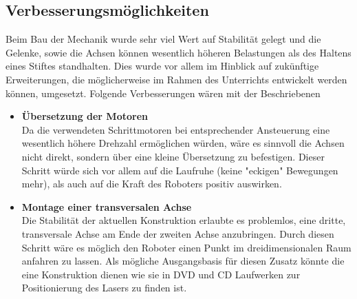 \subsection{Verbesserungsmöglichkeiten}
Beim Bau der Mechanik wurde sehr viel Wert auf Stabilität gelegt und die Gelenke, sowie die Achsen können wesentlich höheren Belastungen als des Haltens eines Stiftes standhalten. 
Dies wurde vor allem im Hinblick auf zukünftige Erweiterungen, die möglicherweise im Rahmen des Unterrichts entwickelt werden können, umgesetzt. Folgende Verbesserungen wären mit der Beschriebenen 

\begin{itemize}
\item \textbf{Übersetzung der Motoren}\\
Da die verwendeten Schrittmotoren bei entsprechender Ansteuerung eine wesentlich höhere Drehzahl ermöglichen würden, wäre es sinnvoll die Achsen nicht direkt, sondern über eine kleine Übersetzung zu befestigen. Dieser Schritt würde sich vor allem auf die Laufruhe (keine "eckigen" Bewegungen mehr), als auch auf die Kraft des Roboters positiv auswirken.

\item \textbf{Montage einer transversalen Achse}\\
Die Stabilität der aktuellen Konstruktion erlaubte es problemlos, eine dritte, transversale Achse am Ende der zweiten Achse anzubringen. Durch diesen Schritt wäre es möglich den Roboter einen Punkt im dreidimensionalen Raum anfahren zu lassen.
Als mögliche Ausgangsbasis für diesen Zusatz könnte die eine Konstruktion dienen wie sie in DVD und CD Laufwerken zur Positionierung des Lasers zu finden ist.
\end{itemize}